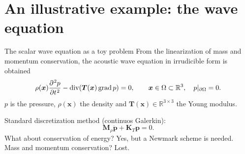 \documentclass[aspectratio=169]{beamer}
\DeclareMathOperator*{\grad}{grad}
\renewcommand{\div}{\operatorname{div}}
\newcommand{\bbR}{\mathbb{R}}
\begin{document}
\section{An illustrative example: the wave equation}


\begin{frame}{The scalar wave equation as a toy problem}
From the linearization of mass and momentum conservation, the acoustic wave equation in irrudicible form is obtained
\begin{equation*}
\rho(\bm{x}) \diffp[2]{p}{t} - \div(\bm{T}(\bm{x})\grad p) = 0,  \qquad \bm{x} \in \Omega \subset \bbR^3, \quad p|_{\partial\Omega} =0.
\end{equation*}
$p$ is the pressure, $\rho(\bm{x})$ the density and $\bm{T}(\bm{x}) \in \bbR^{3\times 3}$ the Young modulus.

Standard discretization method (continuos Galerkin):
\begin{equation*}
	\mathbf{M}_\rho \ddot{\mathbf{p}} + \mathbf{K}_{T} \mathbf{p} = 0.
\end{equation*}
What about conservation of energy? Yes, but a Newmark scheme is needed.\\
Mass and momentum conservation? Lost.
\end{frame}
\end{document}
